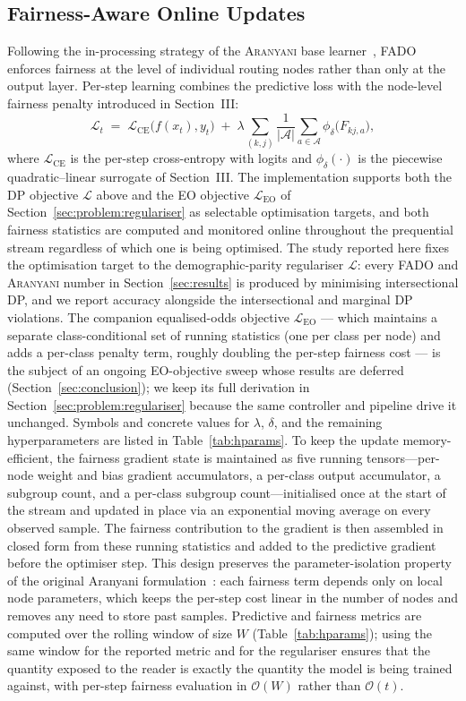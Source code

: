 \documentclass[sigconf,anonymous,review]{acmart}
\begin{document}
\subsection{Fairness-Aware Online Updates}
\label{sec:method:updates}
Following the in-processing strategy of the \textsc{Aranyani} base learner~\cite{chowdhury2024enhancing}, \textsc{FADO} enforces fairness at the level of individual routing
nodes rather than only at the output layer. Per-step learning combines the predictive loss with the node-level fairness penalty introduced in Section~III:
\[
\mathcal{L}_t \;=\; \mathcal{L}_{\mathrm{CE}}\bigl(f(x_t), y_t\bigr) \;+\; \lambda \sum_{(k,j)} \frac{1}{|\mathcal{A}|}\sum_{a \in \mathcal{A}} \phi_\delta\!\bigl(F_{kj,a}\bigr),
\]
where $\mathcal{L}_{\mathrm{CE}}$ is the per-step cross-entropy with logits and $\phi_\delta(\cdot)$ is the piecewise quadratic--linear surrogate of Section~III. The
implementation supports both the DP objective $\mathcal{L}$ above and the EO objective $\mathcal{L}_{\mathrm{EO}}$ of Section~\ref{sec:problem:regulariser} as
selectable optimisation targets, and both fairness statistics are computed and monitored online throughout the prequential stream regardless of which one is being
optimised. The study reported here fixes the optimisation target to the demographic-parity regulariser $\mathcal{L}$: every \textsc{FADO} and \textsc{Aranyani} number
in Section~\ref{sec:results} is produced by minimising intersectional DP, and we report accuracy alongside the intersectional and marginal DP violations. The
companion equalised-odds objective $\mathcal{L}_{\mathrm{EO}}$ --- which maintains a separate class-conditional set of running statistics (one per class per node) and
adds a per-class penalty term, roughly doubling the per-step fairness cost --- is the subject of an ongoing EO-objective sweep whose results are deferred
(Section~\ref{sec:conclusion}); we keep its full derivation in Section~\ref{sec:problem:regulariser} because the same controller and pipeline drive it unchanged.
Symbols and concrete values for $\lambda$, $\delta$, and the remaining hyperparameters are listed in Table~\ref{tab:hparams}.
To keep the update memory-efficient, the fairness gradient state is maintained as five running tensors—per-node weight and bias gradient accumulators, a per-class
output accumulator, a subgroup count, and a per-class subgroup count—initialised once at the start of the stream and updated in place via an exponential moving average
on every observed sample. The fairness contribution to the gradient is then assembled in closed form from these running statistics and added to the predictive gradient
before the optimiser step. This design preserves the parameter-isolation property of the original Aranyani formulation~\cite{chowdhury2024enhancing}: each fairness term
depends only on local node parameters, which keeps the per-step cost linear in the number of nodes and removes any need to store past samples.
Predictive and fairness metrics are computed over the rolling window of size $W$ (Table~\ref{tab:hparams}); using the same window for the reported metric and for the
regulariser ensures that the quantity exposed to the reader is exactly the quantity the model is being trained against, with per-step fairness evaluation in $\mathcal{O}(W)$
rather than $\mathcal{O}(t)$.
\end{document}
